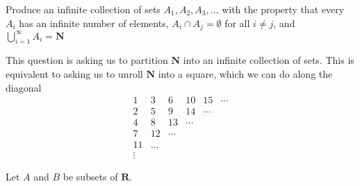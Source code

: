 \begin{solution}
\end{solution}

\begin{exercise}
  Produce an infinite collection of sets $A_{1}, A_{2}, A_{3}, \ldots$ with the property that every $A_{i}$ has an infinite number of elements, $A_{i} \cap A_{j}=\emptyset$ for all $i \neq j$, and $\bigcup_{i=1}^{\infty} A_{i}=\mathbf{N}$
\end{exercise}

\begin{solution}
  This question is asking us to partition $\mathbf N$ into an infinite collection of sets.
  This is equivalent to asking us to unroll $\mathbf N$ into a square, which we can do along the diagonal
  $$
  \begin{array}{lccccc}
    1 & 3 & 6 & 10 & 15 & \cdots \\
    2 & 5 & 9 & 14 & \cdots & \\
    4 & 8 & 13 & \cdots & & \\
    7 & 12 & \cdots & & & \\
    11 & \ldots & & & & \\
    \vdots & & & & &
  \end{array}
  $$
\end{solution}

\begin{exercise}
  \label{demorgan}
  Let $A$ and $B$ be subsets of $\mathbf R$.
\end{exercise}


